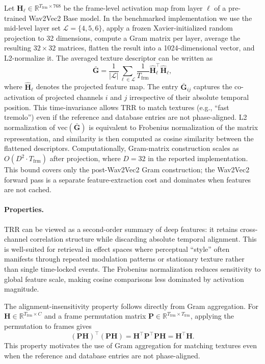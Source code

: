 Let $\mathbf{H}_{\ell} \in \mathbb{R}^{T_{\text{frm}} \times 768}$ be the frame-level activation map from layer $\ell$ of a pre-trained Wav2Vec2 Base model. In the benchmarked implementation we use the mid-level layer set $\mathcal{L}=\{4,5,6\}$, apply a frozen Xavier-initialized random projection to 32 dimensions, compute a Gram matrix per layer, average the resulting $32\times 32$ matrices, flatten the result into a 1024-dimensional vector, and L2-normalize it. The averaged texture descriptor can be written as
\begin{equation}
		\bar{\mathbf{G}} = \frac{1}{|\mathcal{L}|}\sum_{\ell\in\mathcal{L}} \frac{1}{T_{\text{frm}}}\widehat{\mathbf{H}}_{\ell}^{\top}\widehat{\mathbf{H}}_{\ell},
\end{equation}
where $\widehat{\mathbf{H}}_{\ell}$ denotes the projected feature map. The entry $\bar{\mathbf{G}}_{ij}$ captures the co-activation of projected channels $i$ and $j$ irrespective of their absolute temporal position. This time-invariance allows TRR to match textures (e.g., ``fast tremolo'') even if the reference and database entries are not phase-aligned. L2 normalization of $\mathrm{vec}(\bar{\mathbf{G}})$ is equivalent to Frobenius normalization of the matrix representation, and similarity is then computed as cosine similarity between the flattened descriptors. Computationally, Gram-matrix construction scales as $O(D^2 \cdot T_{\text{frm}})$ after projection, where $D=32$ in the reported implementation. This bound covers only the post-Wav2Vec2 Gram construction; the Wav2Vec2 forward pass is a separate feature-extraction cost and dominates when features are not cached.

\paragraph{Properties.}
TRR can be viewed as a second-order summary of deep features: it retains cross-channel correlation structure while discarding absolute temporal alignment. This is well-suited for retrieval in effect spaces where perceptual ``style'' often manifests through repeated modulation patterns or stationary texture rather than single time-locked events. The Frobenius normalization reduces sensitivity to global feature scale, making cosine comparisons less dominated by activation magnitude.

The alignment-insensitivity property follows directly from Gram aggregation. For $\mathbf{H}\in\mathbb{R}^{T_{\text{frm}}\times C}$ and a frame permutation matrix $\mathbf{P}\in\mathbb{R}^{T_{\text{frm}}\times T_{\text{frm}}}$, applying the permutation to frames gives
\begin{equation}
	(\mathbf{P}\mathbf{H})^\top(\mathbf{P}\mathbf{H})=\mathbf{H}^\top\mathbf{P}^\top\mathbf{P}\mathbf{H}=\mathbf{H}^\top\mathbf{H}.
\end{equation}
This property motivates the use of Gram aggregation for matching textures even when the reference and database entries are not phase-aligned.

